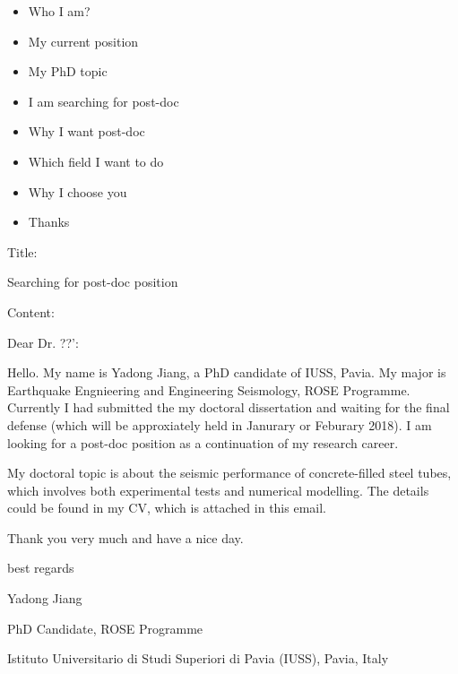 \documentclass[a4paper]{article}
\begin{document}
\begin{itemize}
	\item Who I am?
	\item My current position
	\item My PhD topic
	\item I am searching for post-doc
	\item Why I want post-doc
	\item Which field I want to do
	\item Why I choose you
	\item Thanks
\end{itemize}




Title:

Searching for post-doc position

Content:

Dear Dr. ??':

Hello. My name is Yadong Jiang, a PhD candidate of IUSS, Pavia. My major is Earthquake Engnieering and Engineering Seismology, ROSE Programme. Currently I had submitted the my doctoral dissertation and waiting for the final defense (which will be approxiately held in Janurary or Feburary 2018).  I am looking for a post-doc position as a continuation of my research career.

My doctoral topic is about the seismic performance of concrete-filled steel tubes, which involves both experimental tests and numerical modelling. The details could be found in my CV, which is attached in this email.

Thank you very much and have a nice day.

best regards

Yadong Jiang

PhD Candidate, ROSE Programme

Istituto Universitario di Studi Superiori di Pavia (IUSS), Pavia, Italy
\end{document}
